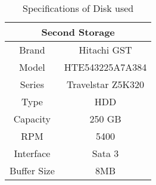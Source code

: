 
\begin{table}[H]
\centering
\begin{tabular}{|c|c|}
\hline
\multicolumn{2}{|c|}{Second Storage} \\ \hline
Brand          & Hitachi GST         \\ \hline
Model          & HTE543225A7A384     \\ \hline
Series         & Travelstar Z5K320   \\ \hline
Type           & HDD                 \\ \hline
Capacity       & 250 GB              \\ \hline
RPM            & 5400                \\ \hline
Interface      & Sata 3              \\ \hline
Buffer Size    & 8MB                 \\ \hline
\end{tabular}
\caption{Specifications of Disk used}\label{tab:diskspec}

\end{table}